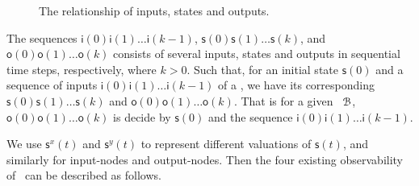  \begin{figure}[!t]
      \centering
      
      \caption{The relationship of inputs, states and outputs.}
      \label{fig:10}
  \end{figure}
   The sequences $\mathsf{i}(0)\mathsf{i}(1)\ldots\mathsf{i}(k-1)$,  $\mathsf{s}(0)\mathsf{s}(1)\ldots\mathsf{s}(k)$, and $\mathsf{o}(0)\mathsf{o}(1)\ldots\mathsf{o}(k)$ 
 consists of several inputs, states and outputs in sequential time steps,  respectively, where $k>0$. 
 Such that, for an initial state $\mathsf{s}(0)$ and a  sequence of inputs $\mathsf{i}(0)\mathsf{i}(1)\ldots\mathsf{i}(k-1)$ of a \BCN, we have its corresponding 
$\mathsf{s}(0)\mathsf{s}(1)\ldots\mathsf{s}(k)$ and $\mathsf{o}(0)\mathsf{o}(1)\ldots\mathsf{o}(k)$.  
That is for a given  \BCN\  ${\mathcal{B}}$,  $\mathsf{o}(0)\mathsf{o}(1)\ldots\mathsf{o}(k)$ is decide by
$\mathsf{s}(0)$ and the sequence $\mathsf{i}(0)\mathsf{i}(1)\ldots\mathsf{i}(k-1)$. 
 
We use $\mathsf{s}^{x}(t)$ and $\mathsf{s}^{y}(t)$ to represent different valuations of $\mathsf{s}(t)$, and similarly for input-nodes and output-nodes. Then the four existing observability of \BCNs\ can be described as follows. 

